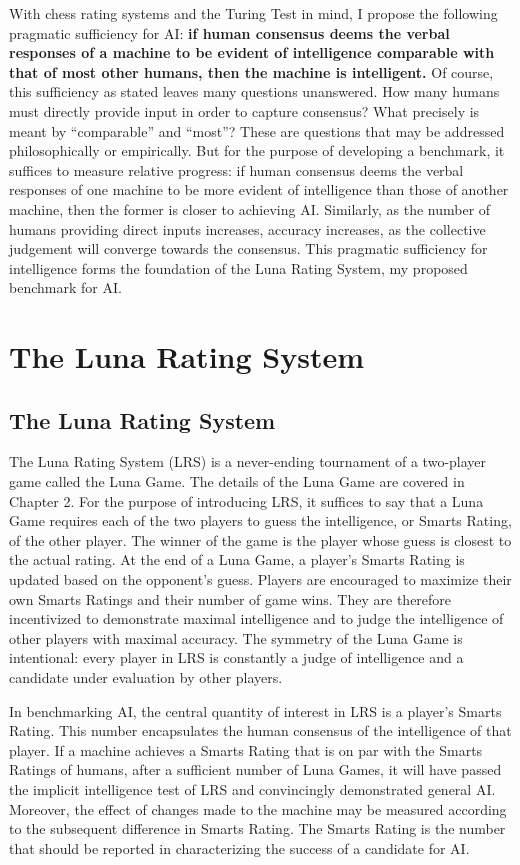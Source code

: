With chess rating systems and the Turing Test in mind, I propose the following pragmatic sufficiency for AI: \textbf{if human consensus deems the verbal responses of a machine to be evident of intelligence comparable with that of most other humans, then the machine is intelligent.}  Of course, this sufficiency as stated leaves many questions unanswered. How many humans must directly provide input in order to capture consensus? What precisely is meant by ``comparable'' and ``most''? These are questions that may be addressed philosophically or empirically. But for the purpose of developing a benchmark, it suffices to measure relative progress: if human consensus deems the verbal responses of one machine to be more evident of intelligence than those of another machine, then the former is closer to achieving AI. Similarly, as the number of humans providing direct inputs increases, accuracy increases, as the collective judgement will converge towards the consensus. This pragmatic sufficiency for intelligence forms the foundation of the Luna Rating System, my proposed benchmark for AI.

\section{The Luna Rating System}

\subsection{The Luna Rating System}

The Luna Rating System (LRS) is a never-ending tournament of a two-player game called the Luna Game. The details of the Luna Game are covered in Chapter 2. For the purpose of introducing LRS, it suffices to say that a Luna Game requires each of the two players to guess the intelligence, or Smarts Rating, of the other player. The winner of the game is the player whose guess is closest to the actual rating. At the end of a Luna Game, a player's Smarts Rating is updated based on the opponent's guess. Players are encouraged to maximize their own Smarts Ratings and their number of game wins. They are therefore incentivized to demonstrate maximal intelligence and to judge the intelligence of other players with maximal accuracy. The symmetry of the Luna Game is intentional: every player in LRS is constantly a judge of intelligence and a candidate under evaluation by other players.

In benchmarking AI, the central quantity of interest in LRS is a player's Smarts Rating. This number encapsulates the human consensus of the intelligence of that player. If a machine achieves a Smarts Rating that is on par with the Smarts Ratings of humans, after a sufficient number of Luna Games, it will have passed the implicit intelligence test of LRS and convincingly demonstrated general AI. Moreover, the effect of changes made to the machine may be measured according to the subsequent difference in Smarts Rating. The Smarts Rating is the number that should be reported in characterizing the success of a candidate for AI.

